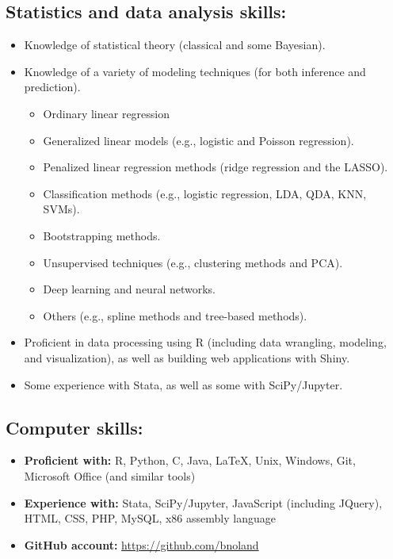 \documentclass[letterpaper,12pt]{article}
\begin{document}
\subsection*{Statistics and data analysis skills:}
\begin{itemize}
\item
Knowledge of statistical theory (classical and some Bayesian).
\item
Knowledge of a variety of modeling techniques (for both inference and prediction).
\begin{itemize}
\item
Ordinary linear regression
\item
Generalized linear models (e.g., logistic and Poisson regression).
\item
Penalized linear regression methods (ridge regression and the LASSO).
\item
Classification methods (e.g., logistic regression, LDA, QDA, KNN, SVMs).
\item
Bootstrapping methods.
\item
Unsupervised techniques (e.g., clustering methods and PCA).
\item
Deep learning and neural networks.
\item
Others (e.g., spline methods and tree-based methods).
\end{itemize}
\item
Proficient in data processing using R (including data wrangling, modeling, and visualization), as 
well as building web applications with Shiny.
\item
Some experience with Stata, as well as some with SciPy/Jupyter.
\end{itemize}

\subsection*{Computer skills:}
\begin{itemize}
\item
\textbf{Proficient with:} R, Python, C, Java, \LaTeX, Unix, Windows, Git, Microsoft Office (and 
similar tools)
\item
\textbf{Experience with:} Stata, SciPy/Jupyter, JavaScript (including JQuery), HTML, CSS, PHP, 
MySQL, x86 assembly language
\item
\textbf{GitHub account:} \url{https://github.com/bnoland}
\end{itemize}
\end{document}
